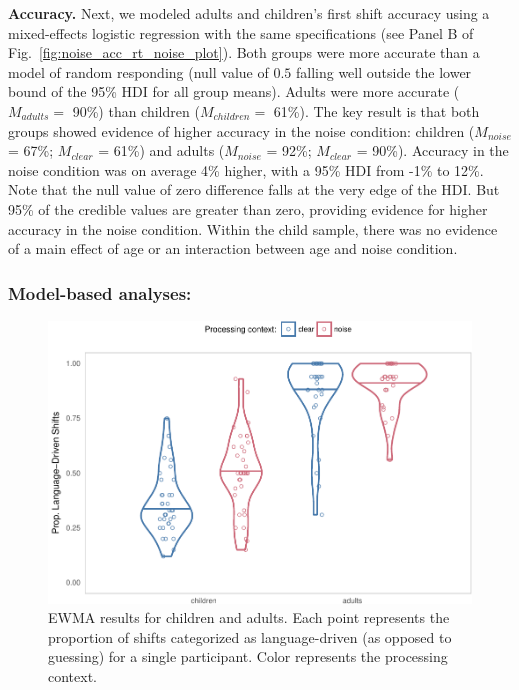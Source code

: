 \documentclass[english,man]{apa6}
\theoremstyle{definition}
\theoremstyle{definition}
\theoremstyle{definition}
\theoremstyle{remark}
\begin{document}
\textbf{Accuracy.} Next, we modeled adults and children's first shift
accuracy using a mixed-effects logistic regression with the same
specifications (see Panel B of Fig.~\ref{fig:noise_acc_rt_noise_plot}).
Both groups were more accurate than a model of random responding (null
value of \(0.5\) falling well outside the lower bound of the 95\% HDI
for all group means). Adults were more accurate (\(M_{adults} =\) 90\%)
than children (\(M_{children} =\) 61\%). The key result is that both
groups showed evidence of higher accuracy in the noise condition:
children (\(M_{noise}\) = 67\%; \(M_{clear}\) = 61\%) and adults
(\(M_{noise}\) = 92\%; \(M_{clear}\) = 90\%). Accuracy in the noise
condition was on average 4\% higher, with a 95\% HDI from -1\% to 12\%.
Note that the null value of zero difference falls at the very edge of
the HDI. But 95\% of the credible values are greater than zero,
providing evidence for higher accuracy in the noise condition. Within
the child sample, there was no evidence of a main effect of age or an
interaction between age and noise condition.

\hypertarget{model-based-analyses-2}{%
\subsubsection{Model-based analyses:}\label{model-based-analyses-2}}

\begin{figure}[tb]

{\centering \includegraphics[width=0.8\linewidth]{figs/noise-violin-ewma-1} 

}

\caption{EWMA results for children and adults. Each point represents the proportion of shifts categorized as language-driven (as opposed to guessing) for a single participant. Color represents the processing context.}\label{fig:noise-violin-ewma}
\end{figure}
\end{document}
